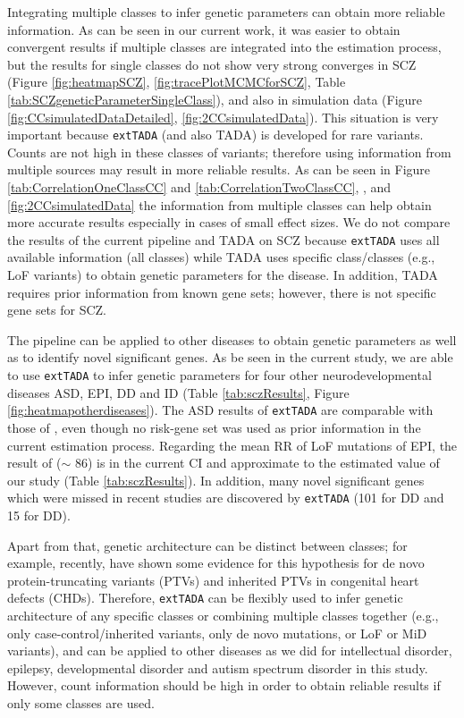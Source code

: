 \documentclass[]{article}
\begin{document}
Integrating multiple classes to infer genetic parameters can obtain
more reliable information. As can be seen in our current work, it was
easier to obtain convergent results if multiple classes are integrated
into the estimation process, but the results for single classes do not
show very strong converges in SCZ (Figure \ref{fig:heatmapSCZ},
\ref{fig:tracePlotMCMCforSCZ}, Table
\ref{tab:SCZgeneticParameterSingleClass}), and also in simulation data
(Figure \ref{fig:CCsimulatedDataDetailed}, \ref{fig:2CCsimulatedData}). This
situation is very important because \texttt{extTADA} (and also TADA) is developed for
rare variants. Counts are not high in these
classes of variants; therefore using information from multiple sources
may result in more reliable results. As can be seen in Figure
\ref{tab:CorrelationOneClassCC} and \ref{tab:CorrelationTwoClassCC},
, and \ref{fig:2CCsimulatedData} the information from multiple classes can help obtain more accurate
results especially in cases of small effect sizes.
We do not compare the results of
the current pipeline and TADA on SCZ because \texttt{extTADA} uses all available
information (all classes) while TADA uses specific class/classes
(e.g., LoF variants) to obtain genetic parameters for the disease. In
addition, TADA requires prior information from known gene sets;
however, there is not specific gene sets for SCZ.

The pipeline can be applied to other diseases to obtain genetic
parameters as well as to identify novel significant genes. As be seen in the current study, we are able to use \texttt{extTADA} to infer
genetic parameters for four other neurodevelopmental diseases ASD, EPI, DD and ID (Table
\ref{tab:sczResults}, Figure \ref{fig:heatmapotherdiseases}). The ASD
results of \texttt{extTADA} are comparable with those of \cite{he2013integrated, de2014synaptic}, even though no risk-gene set
was used as prior information in the current estimation process. Regarding the
mean RR of LoF mutations of EPI, the result of \cite{phenome2014novo}
($\sim$ 86) is in the current CI and approximate to the estimated
value of our study (Table \ref{tab:sczResults}). In addition, many
novel significant genes which were missed in recent studies are
discovered by \texttt{extTADA} (101 for DD and 15 for DD).


Apart from that, genetic
architecture can be distinct between classes; for example, recently,
\cite{sifrim2016distinct} have shown some evidence for this hypothesis for de novo
protein-truncating variants (PTVs) and inherited PTVs in congenital
heart defects (CHDs). Therefore, \texttt{extTADA} can be flexibly used to
infer genetic architecture of any specific classes or combining
multiple classes together (e.g., only case-control/inherited variants,
only de novo mutations, or LoF or MiD variants), and can be applied to
other diseases as we did for intellectual disorder, epilepsy,
developmental disorder and autism spectrum disorder in this
study. However, count information should be high in order to obtain
reliable results if only some classes are used.
\end{document}
